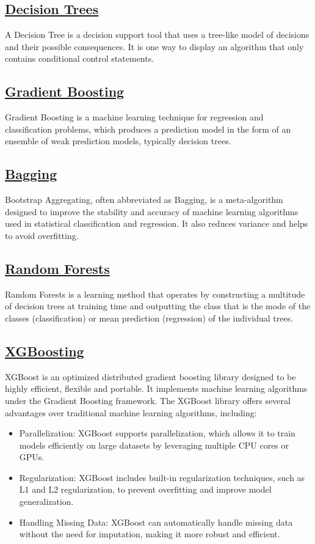 \documentclass[conference]{IEEEtran}
\begin{document}
    \subsection{\href{https://en.wikipedia.org/wiki/Decision_tree}{Decision Trees}}
    A Decision Tree is a decision support tool that uses a tree-like model of decisions and their possible consequences. It is one way to display an algorithm that only contains conditional control statements.
    \subsection{\href{https://en.wikipedia.org/wiki/Gradient_boosting}{Gradient Boosting}}
    Gradient Boosting is a machine learning technique for regression and classification problems, which produces a prediction model in the form of an ensemble of weak prediction models, typically decision trees.
    \subsection{\href{https://en.wikipedia.org/wiki/Bootstrap_aggregating}{Bagging}}
    Bootstrap Aggregating, often abbreviated as Bagging, is a meta-algorithm designed to improve the stability and accuracy of machine learning algorithms used in statistical classification and regression. It also reduces variance and helps to avoid overfitting.
    \subsection{\href{https://en.wikipedia.org/wiki/Random_forest}{Random Forests}}
    Random Forests is a learning method that operates by constructing a multitude of decision trees at training time and outputting the class that is the mode of the classes (classification) or mean prediction (regression) of the individual trees.
    
    \subsection{\href{https://en.wikipedia.org/wiki/XGBoost}{XGBoosting}}
    XGBoost is an optimized distributed gradient boosting library designed to be highly efficient, flexible and portable. It implements machine learning algorithms under the Gradient Boosting framework. The XGBoost library offers several advantages over traditional machine learning algorithms, including:
        \begin{itemize}
        \item Parallelization: XGBoost supports parallelization, which allows it to train models efficiently on large datasets by leveraging multiple CPU cores or GPUs.
        \item Regularization: XGBoost includes built-in regularization techniques, such as L1 and L2 regularization, to prevent overfitting and improve model generalization.
        \item Handling Missing Data: XGBoost can automatically handle missing data without the need for imputation, making it more robust and efficient.
        \end{itemize}
    
\end{document}
